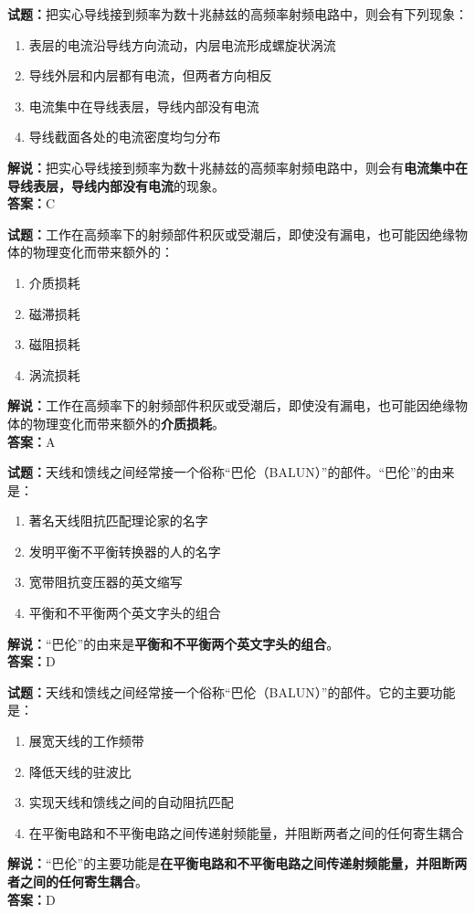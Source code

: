 \documentclass{ctexbook}
\begin{document}
\bigskip


\noindent\textbf{试题：}把实心导线接到频率为数十兆赫兹的高频率射频电路中，则会有下列现象：
\begin{enumerate}[leftmargin=3em]
\item 表层的电流沿导线方向流动，内层电流形成螺旋状涡流
\item 导线外层和内层都有电流，但两者方向相反
\item 电流集中在导线表层，导线内部没有电流
\item 导线截面各处的电流密度均匀分布
\end{enumerate}
\noindent\textbf{解说：}把实心导线接到频率为数十兆赫兹的高频率射频电路中，则会有\textbf{电流集中在导线表层，导线内部没有电流}的现象。\\\noindent\textbf{答案：}C


\bigskip


\noindent\textbf{试题：}工作在高频率下的射频部件积灰或受潮后，即使没有漏电，也可能因绝缘物体的物理变化而带来额外的：
\begin{enumerate}[leftmargin=3em]
\item 介质损耗
\item 磁滞损耗
\item 磁阻损耗
\item 涡流损耗
\end{enumerate}
\noindent\textbf{解说：}工作在高频率下的射频部件积灰或受潮后，即使没有漏电，也可能因绝缘物体的物理变化而带来额外的\textbf{介质损耗}。\\\noindent\textbf{答案：}A



\bigskip


\noindent\textbf{试题：}天线和馈线之间经常接一个俗称“巴伦（BALUN）”的部件。“巴伦”的由来是：
\begin{enumerate}[leftmargin=3em]
\item 著名天线阻抗匹配理论家的名字
\item 发明平衡不平衡转换器的人的名字
\item 宽带阻抗变压器的英文缩写
\item 平衡和不平衡两个英文字头的组合
\end{enumerate}
\noindent\textbf{解说：}“巴伦”的由来是\textbf{平衡和不平衡两个英文字头的组合}。\\\noindent\textbf{答案：}D




\bigskip


\noindent\textbf{试题：}天线和馈线之间经常接一个俗称“巴伦（BALUN）”的部件。它的主要功能是：
\begin{enumerate}[leftmargin=3em]
\item 展宽天线的工作频带
\item 降低天线的驻波比
\item 实现天线和馈线之间的自动阻抗匹配
\item 在平衡电路和不平衡电路之间传递射频能量，并阻断两者之间的任何寄生耦合
\end{enumerate}
\noindent\textbf{解说：}“巴伦”的主要功能是\textbf{在平衡电路和不平衡电路之间传递射频能量，并阻断两者之间的任何寄生耦合}。\\\noindent\textbf{答案：}D
\end{document}
